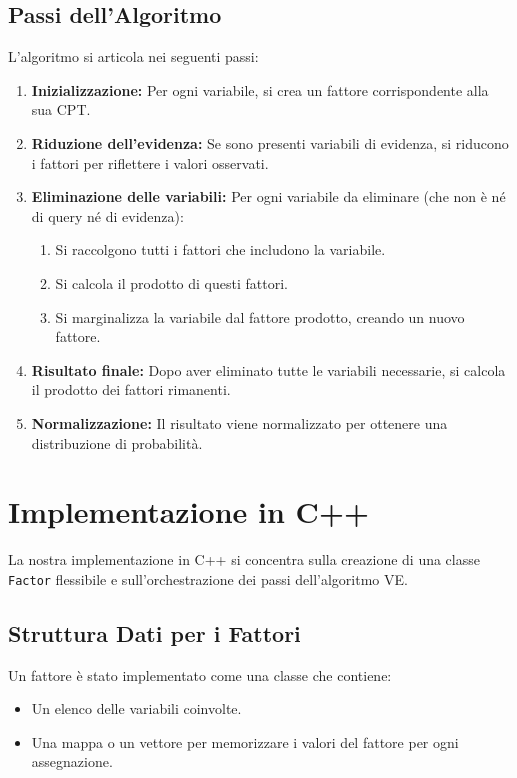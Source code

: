 \documentclass[a4paper, 11pt]{article}
\begin{document}
\subsection{Passi dell'Algoritmo}
L'algoritmo si articola nei seguenti passi:
\begin{enumerate}
    \item \textbf{Inizializzazione:} Per ogni variabile, si crea un fattore corrispondente alla sua CPT.
    \item \textbf{Riduzione dell'evidenza:} Se sono presenti variabili di evidenza, si riducono i fattori per riflettere i valori osservati.
    \item \textbf{Eliminazione delle variabili:} Per ogni variabile da eliminare (che non è né di query né di evidenza):
    \begin{enumerate}
        \item Si raccolgono tutti i fattori che includono la variabile.
        \item Si calcola il prodotto di questi fattori.
        \item Si marginalizza la variabile dal fattore prodotto, creando un nuovo fattore.
    \end{enumerate}
    \item \textbf{Risultato finale:} Dopo aver eliminato tutte le variabili necessarie, si calcola il prodotto dei fattori rimanenti.
    \item \textbf{Normalizzazione:} Il risultato viene normalizzato per ottenere una distribuzione di probabilità.
\end{enumerate}

\section{Implementazione in C++}
La nostra implementazione in C++ si concentra sulla creazione di una classe \texttt{Factor} flessibile e sull'orchestrazione dei passi dell'algoritmo VE.

\subsection{Struttura Dati per i Fattori}
Un fattore è stato implementato come una classe che contiene:
\begin{itemize}
    \item Un elenco delle variabili coinvolte.
    \item Una mappa o un vettore per memorizzare i valori del fattore per ogni assegnazione.
\end{itemize}
\end{document}
